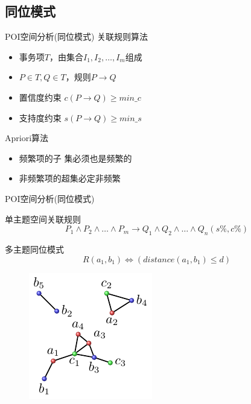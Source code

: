 \subsection{同位模式}

\begin{frame}[c]{POI空间分析(同位模式)}
    \alert{关联规则算法}

    \vspace{1em}
    \begin{itemize}
        \item 事务项$T$，由集合$I_1,I_2,\ldots,I_m$组成
        \item $P \in T, Q \in T$，规则$P \rightarrow Q$
        \item 置信度约束 $c(P \rightarrow Q) \ge min\_c$
        \item 支持度约束 $s(P \rightarrow Q) \ge min\_s$
    \end{itemize}

    \pause
    \vspace{1em}
    \alert{Apriori算法}

    \begin{itemize}
        \item 频繁项的子 集必须也是频繁的
        \item 非频繁项的超集必定非频繁
    \end{itemize}
\end{frame}

\begin{frame}[t]{POI空间分析(同位模式)}

    \begin{alert}{单主题空间关联规则}
     \begin{equation}
        P_1\wedge P_2\wedge \ldots \wedge P_m \rightarrow Q_1\wedge Q_2\wedge \ldots \wedge Q_n(s\%, c\%)
    \end{equation}
    \end{alert}
    
    \pause
    \begin{alert}{多主题同位模式}
            \begin{equation}
                R(a_1,b_1) \Leftrightarrow (distance(a_1,b_1)\le d)
            \end{equation}

            \pause
            \begin{figure}
                \centering
                \includegraphics[scale=1.0]{figures/spatialrelation.pdf}
            \end{figure}
    \end{alert}

\end{frame}


